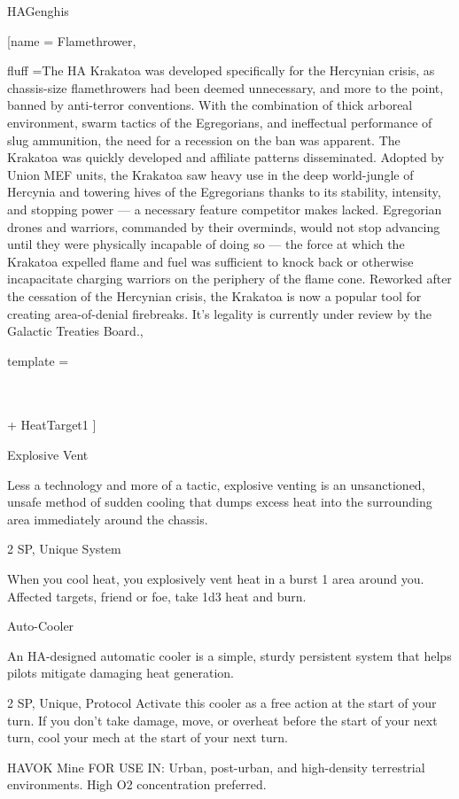 \begin{mech}{HA}{Genghis}
\gearBox

[name = {Flamethrower},

fluff ={The HA Krakatoa was developed specifically for the Hercynian crisis, as chassis-size flamethrowers had been deemed unnecessary, and more to the point, banned by anti-terror conventions. With the combination of thick arboreal environment, swarm tactics of the Egregorians, and ineffectual performance of slug ammunition, the need for a recession on the ban was apparent. The Krakatoa was quickly developed and affiliate patterns disseminated. Adopted by Union MEF units, the Krakatoa saw heavy use in the deep world-jungle of Hercynia and towering hives of the Egregorians thanks to its stability, intensity, and stopping power — a necessary feature competitor makes lacked. Egregorian drones and warriors, commanded by their overminds, would not stop advancing until they were physically incapable of doing so — the force at which the Krakatoa expelled flame and fuel was sufficient to knock back or otherwise incapacitate charging warriors on the periphery of the flame cone. Reworked after the cessation of the Hercynian crisis, the Krakatoa is now a popular tool for creating area-of-denial firebreaks. It’s legality is currently under review by the Galactic Treaties Board.},

template = {\Heavy \CQB\\
\\
 + HeatTarget{1}
]

Explosive Vent

Less a technology and more of a tactic, explosive venting is an unsanctioned, unsafe method of sudden cooling that dumps excess heat into the surrounding area immediately around the chassis.

2 SP, Unique
System

When you cool heat, you explosively vent heat in a burst 1 area around you. Affected targets, friend or foe, take 1d3 heat and burn.


Auto-Cooler

An HA-designed automatic cooler is a simple, sturdy persistent system that helps pilots mitigate damaging heat generation.

2 SP, Unique, Protocol
Activate this cooler as a free action at the start of your turn. If you don’t take damage, move, or overheat before the start of your next turn, cool your mech at the start of your next turn.


HAVOK Mine
FOR USE IN: Urban, post-urban, and high-density terrestrial environments. High O2  concentration preferred.

}
\end{mech}
